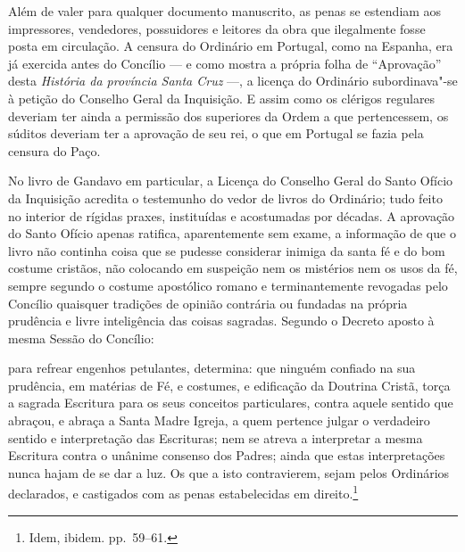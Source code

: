 Além de valer para qualquer documento manuscrito, as penas se estendiam
aos impressores, vendedores, possuidores e leitores da obra que
ilegalmente fosse posta em circulação. A censura do Ordinário em
Portugal, como na Espanha, era já exercida antes do Concílio --- e como
mostra a própria folha de ``Aprovação'' desta
\emph{História da província Santa Cruz} ---, a licença do Ordinário
subordinava"-se à petição do Conselho Geral da Inquisição. E assim como
os clérigos regulares deveriam ter ainda a permissão dos superiores da
Ordem a que pertencessem, os súditos deveriam ter a aprovação de seu
rei, o que em Portugal se fazia pela censura do Paço.

No livro de Gandavo em particular, a Licença do Conselho Geral do Santo
Ofício da Inquisição acredita o testemunho do vedor de livros do
Ordinário; tudo feito no interior de rígidas praxes, instituídas e
acostumadas por décadas. A aprovação do Santo Ofício apenas ratifica,
aparentemente sem exame, a informação de que o livro não continha coisa
que se pudesse considerar inimiga da santa fé e do bom costume
cristãos, não colocando em suspeição nem os mistérios nem os usos da
fé, sempre segundo o costume apostólico romano e terminantemente
revogadas pelo Concílio quaisquer tradições de opinião contrária ou
fundadas na própria prudência e livre inteligência das coisas sagradas.
Segundo o Decreto aposto à mesma Sessão do Concílio:
\begin{hedraquote}
para refrear engenhos petulantes, determina: que ninguém confiado na sua
prudência, em matérias de Fé, e costumes, e edificação da Doutrina
Cristã, torça a sagrada Escritura para os seus conceitos particulares,
contra aquele sentido que abraçou, e abraça a Santa Madre Igreja, a
quem pertence julgar o verdadeiro sentido e interpretação das
Escrituras; nem se atreva a interpretar a mesma Escritura contra o
unânime consenso dos Padres; ainda que estas interpretações nunca hajam
de se dar a luz. Os que a isto contravierem, sejam pelos Ordinários
declarados, e castigados com as penas estabelecidas em
direito.\footnote{ Idem, ibidem. pp.~59--61.}
\end{hedraquote}

